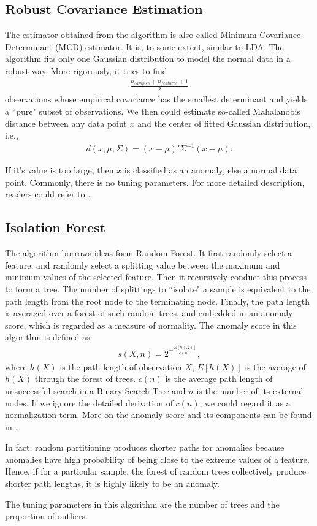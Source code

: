 \documentclass[english]{article}
\newenvironment{eqt}{\begin{equation}\begin{aligned}}{\end{aligned}\end{equation}}
\begin{document}
\subsection{Robust Covariance Estimation}
\par
The estimator obtained from the algorithm is also called Minimum Covariance Determinant (MCD) estimator. It is, to some extent, similar to LDA. The algorithm fits only one Gaussian distribution to model the normal data in a robust way. More rigorously, it tries to find 
\begin{eqt}
\frac{n_{\textit{samples}}+n_{\textit{features}}+1}{2}
\end{eqt}
observations whose empirical covariance has the smallest determinant and yields a ``pure" subset of observations. We then could estimate so-called Mahalanobis distance between any data point $x$ and the center of fitted Gaussian distribution, i.e., 
\begin{eqt}
\label{mahadist}
d(x; \mu, \Sigma) = (x-\mu)'\Sigma^{-1}(x-\mu).
\end{eqt}
\par
If it's value is too large, then $x$ is classified as an anomaly, else a normal data point. Commonly, there is no tuning parameters. For more detailed description, readers could refer to \cite{robustcov}.


\subsection{Isolation Forest}
\par
The algorithm borrows ideas form Random Forest. It first randomly select a feature, and randomly select a splitting value between the maximum and minimum values of the selected feature. Then it recursively conduct this process to form a tree. The number of splittings to ``isolate" a sample is equivalent to the path length from the root node to the terminating node. Finally, the path length is averaged over a forest of such random trees, and embedded in an anomaly score, which is regarded as a measure of normality. The anomaly score in this algorithm is defined as 
\begin{eqt}
s(X, n) = 2^{-\frac{E[h(X)]}{c(n)}},
\end{eqt}
where $h(X)$ is the path length of observation $X$, $E[h(X)]$ is the average of $h(X)$ through the forest of trees. $c(n)$ is the average path length of unsuccessful search in a Binary Search Tree and $n$ is the number of its external nodes. If we ignore the detailed derivation of $c(n)$, we could regard it as a normalization term. More on the anomaly score and its components can be found in \cite{isolationforest}.
\par
In fact, random partitioning produces shorter paths for anomalies because anomalies have high probability of being close to the extreme values of a feature. Hence, if for a particular sample, the forest of random trees collectively produce shorter path lengths, it is highly likely to be an anomaly.
\par The tuning parameters in this algorithm are the number of trees and the proportion of outliers.
\end{document}
